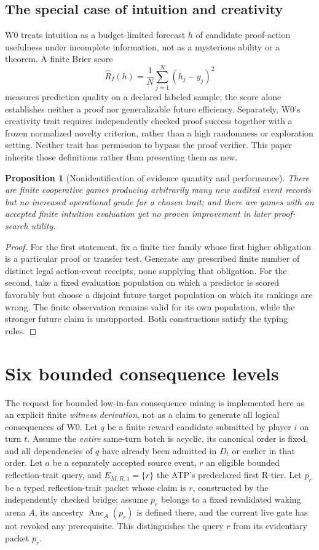 \documentclass[11pt,letterpaper]{article}
\newtheorem{proposition}[theorem]{Proposition}
\newcommand{\Anc}{\operatorname{Anc}}
\begin{document}
\subsection{The special case of intuition and creativity}
W0 treats intuition as a budget-limited forecast $h$ of candidate proof-action usefulness under incomplete information, not as a mysterious ability or a theorem. A finite Brier score
\[
\widehat R_I(h)=\frac1N\sum_{j=1}^{N}(h_j-y_j)^2
\]
measures prediction quality on a declared labeled sample; the score alone establishes neither a proof nor generalizable future efficiency. Separately, W0's creativity trait requires independently checked proof success together with a frozen normalized novelty criterion, rather than a high randomness or exploration setting. Neither trait has permission to bypass the proof verifier. This paper inherits those definitions rather than presenting them as new.

\begin{proposition}[Nonidentification of evidence quantity and performance]\label{prop:nonperf}
There are finite cooperative games producing arbitrarily many new audited event records but no increased operational grade for a chosen trait; and there are games with an accepted finite intuition evaluation yet no proven improvement in later proof-search utility.
\end{proposition}
\begin{proof}
For the first statement, fix a finite tier family whose first higher obligation is a particular proof or transfer test. Generate any prescribed finite number of distinct legal action-event receipts, none supplying that obligation. For the second, take a fixed evaluation population on which a predictor is scored favorably but choose a disjoint future target population on which its rankings are wrong. The finite observation remains valid for its own population, while the stronger future claim is unsupported. Both constructions satisfy the typing rules.
\end{proof}

\section{Six bounded consequence levels}\label{gl-first-W1-s8}
The request for bounded low-in-fan consequence mining is implemented here as an explicit finite \emph{witness derivation}, not as a claim to generate all logical consequences of W0. Let $q$ be a finite reward candidate submitted by player $i$ on turn $t$. Assume the \emph{entire} same-turn batch is acyclic, its canonical order is fixed, and all dependencies of $q$ have already been admitted in $D_t$ or earlier in that order. Let $a$ be a separately accepted source event, $r$ an eligible bounded reflection-trait query, and $E_{M,R,1}=\{r\}$ the ATP's predeclared first R-tier. Let $p_r$ be a typed reflection-trait packet whose claim is $r$, constructed by the independently checked bridge; assume $p_r$ belongs to a fixed revalidated waking arena $A$, its ancestry $\Anc_A(p_r)$ is defined there, and the current live gate has not revoked any prerequisite. This distinguishes the query $r$ from its evidentiary packet $p_r$.
\end{document}
